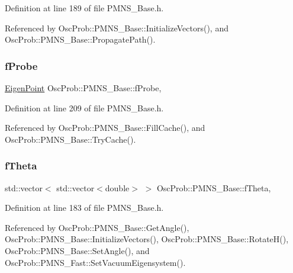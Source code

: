 Definition at line 189 of file P\+M\+N\+S\+\_\+\+Base.\+h.



Referenced by Osc\+Prob\+::\+P\+M\+N\+S\+\_\+\+Base\+::\+Initialize\+Vectors(), and Osc\+Prob\+::\+P\+M\+N\+S\+\_\+\+Base\+::\+Propagate\+Path().

\mbox{\label{classOscProb_1_1PMNS__Base_ab1fe4800ee3ae48df4fc942dce00e0d3}} 
\subsubsection{\texorpdfstring{f\+Probe}{fProbe}}
{\footnotesize\ttfamily \hyperlink{structOscProb_1_1EigenPoint}{Eigen\+Point} Osc\+Prob\+::\+P\+M\+N\+S\+\_\+\+Base\+::f\+Probe\hspace{0.3cm}{\ttfamily [protected]}, {\ttfamily [inherited]}}



Definition at line 209 of file P\+M\+N\+S\+\_\+\+Base.\+h.



Referenced by Osc\+Prob\+::\+P\+M\+N\+S\+\_\+\+Base\+::\+Fill\+Cache(), and Osc\+Prob\+::\+P\+M\+N\+S\+\_\+\+Base\+::\+Try\+Cache().

\mbox{\label{classOscProb_1_1PMNS__Base_a1976887cd658dd86b2336c181f1470b4}} 
\subsubsection{\texorpdfstring{f\+Theta}{fTheta}}
{\footnotesize\ttfamily std\+::vector$<$ std\+::vector$<$double$>$ $>$ Osc\+Prob\+::\+P\+M\+N\+S\+\_\+\+Base\+::f\+Theta\hspace{0.3cm}{\ttfamily [protected]}, {\ttfamily [inherited]}}



Definition at line 183 of file P\+M\+N\+S\+\_\+\+Base.\+h.



Referenced by Osc\+Prob\+::\+P\+M\+N\+S\+\_\+\+Base\+::\+Get\+Angle(), Osc\+Prob\+::\+P\+M\+N\+S\+\_\+\+Base\+::\+Initialize\+Vectors(), Osc\+Prob\+::\+P\+M\+N\+S\+\_\+\+Base\+::\+Rotate\+H(), Osc\+Prob\+::\+P\+M\+N\+S\+\_\+\+Base\+::\+Set\+Angle(), and Osc\+Prob\+::\+P\+M\+N\+S\+\_\+\+Fast\+::\+Set\+Vacuum\+Eigensystem().

